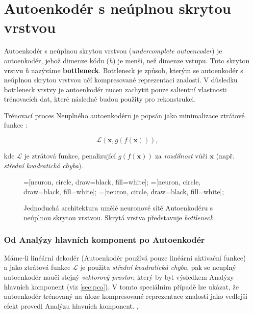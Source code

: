 \section{Autoenkodér s neúplnou skrytou vrstvou}
\label{sec:undercomplete_autoencoder}
Autoenkodér s neúplnou skrytou vrstvou (\emph{undercomplete autoencoder}) je autoenkodér, jehož dimenze kódu (\emph{h}) je menší, než dimenze vstupu.
Tuto skrytou vrstvu \emph{h} nazýváme \textbf{bottleneck}. Bottleneck je způsob, kterým se autoenkodér s neúplnou skrytou vrstvou učí kompresované reprezentaci znalostí. 
V důsledku bottleneck vrstvy je autoenkodér nucen zachytit pouze salientní vlastnosti trénovacích dat, které následně budou použity pro rekonstrukci. \cite{Goodfellow2016}

Trénovací proces Neuplného autoenkodéru je popsán jako minimalizace ztrátové funkce \cite{Charte2018}:

\begin{equation}
    \mathcal{L}(\mathbf{x}, g(f(\mathbf{x}))),
\end{equation}

kde $\mathcal{L}$ je ztrátová funkce, penalizující $g(f(\mathbf{x}))$ za \emph{rozdílnost} vůči $\mathbf{x}$ (např. \emph{střední kvadratická chyba}).


\begin{figure}[H]
    \centering
    \begin{neuralnetwork}[height=4]
        =[neuron, circle, draw=black, fill=white];
        =[neuron, circle, draw=black, fill=white];
        =[neuron, circle, draw=black, fill=white];
      
      
      
        \hiddenlayer[count=2, bias=false, title=Kód $\emph{h}$]
        \linklayers
      
        \outputlayer[count=4, title=Dekodér, text=\xout]
        \linklayers
      
      \end{neuralnetwork}
    \caption{Jednoduchá architektura umělé neuronové sítě Autoenkodéru s neúplnou skrytou vrstvou. Skrytá vrstva představuje \emph{bottleneck}.}
    \label{fig:autoencoder_bottleneck}
\end{figure}
\subsubsection{Od Analýzy hlavních komponent po Autoenkodér}
Máme-li linéární dekodér (Autoenkodér používá pouze linéárni aktivační funkce) a jako ztrátová funkce $\mathcal{L}$ je použita \emph{střední kvadratická chyba},
pak se neuplný autoenkodér naučí stejný \emph{vektorový prostor}, který by byl výsledkem Analýzy hlavních komponent (viz \autoref{sec:pca}).
V tomto speciálním případě lze ukázat, že autoenkodér trénovaný na úloze kompresované reprezentace znalostí jako vedlejší efekt provedl Analýzu hlavních komponent. \cite{Baldi1989}, \cite{Kamyshanska2013}

